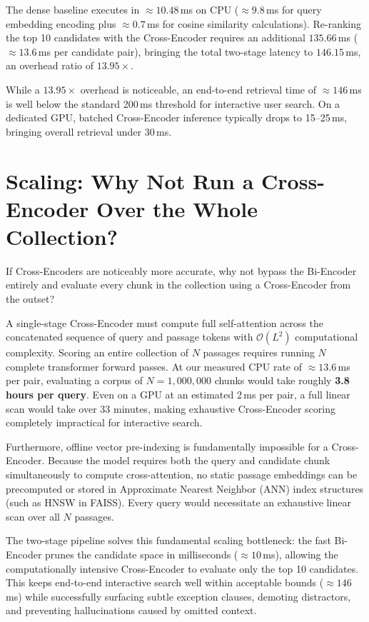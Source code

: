 \documentclass[11pt,a4paper]{article}
\begin{document}
The dense baseline executes in $\approx 10.48$\,ms on CPU ($\approx 9.8$\,ms for query embedding encoding plus $\approx 0.7$\,ms for cosine similarity calculations). Re-ranking the top 10 candidates with the Cross-Encoder requires an additional $135.66$\,ms ($\approx 13.6$\,ms per candidate pair), bringing the total two-stage latency to $146.15$\,ms, an overhead ratio of $13.95\times$.

While a $13.95\times$ overhead is noticeable, an end-to-end retrieval time of $\approx 146$\,ms is well below the standard 200\,ms threshold for interactive user search. On a dedicated GPU, batched Cross-Encoder inference typically drops to 15--25\,ms, bringing overall retrieval under 30\,ms.

\section{Scaling: Why Not Run a Cross-Encoder Over the Whole Collection?}

If Cross-Encoders are noticeably more accurate, why not bypass the Bi-Encoder entirely and evaluate every chunk in the collection using a Cross-Encoder from the outset?

A single-stage Cross-Encoder must compute full self-attention across the concatenated sequence of query and passage tokens with $\mathcal{O}(L^2)$ computational complexity. Scoring an entire collection of $N$ passages requires running $N$ complete transformer forward passes. At our measured CPU rate of $\approx 13.6$\,ms per pair, evaluating a corpus of $N = 1,000,000$ chunks would take roughly \textbf{3.8 hours per query}. Even on a GPU at an estimated 2\,ms per pair, a full linear scan would take over 33 minutes, making exhaustive Cross-Encoder scoring completely impractical for interactive search.

Furthermore, offline vector pre-indexing is fundamentally impossible for a Cross-Encoder. Because the model requires both the query and candidate chunk simultaneously to compute cross-attention, no static passage embeddings can be precomputed or stored in Approximate Nearest Neighbor (ANN) index structures (such as HNSW in FAISS). Every query would necessitate an exhaustive linear scan over all $N$ passages.

The two-stage pipeline solves this fundamental scaling bottleneck: the fast Bi-Encoder prunes the candidate space in milliseconds ($\approx 10$\,ms), allowing the computationally intensive Cross-Encoder to evaluate only the top 10 candidates. This keeps end-to-end interactive search well within acceptable bounds ($\approx 146$\,ms) while successfully surfacing subtle exception clauses, demoting distractors, and preventing hallucinations caused by omitted context.
\end{document}
